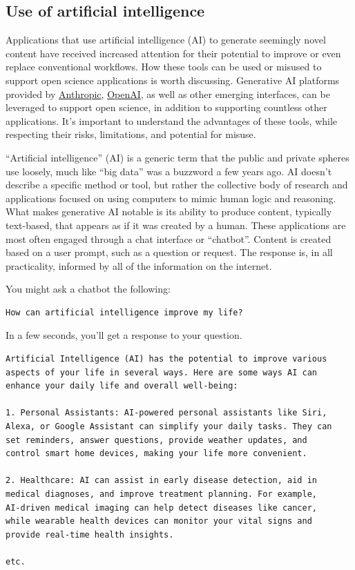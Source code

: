 \documentclass[
]{book}
\begin{document}
\subsection{Use of artificial intelligence}\label{aiuse}

Applications that use artificial intelligence (AI) to generate seemingly novel content have received increased attention for their potential to improve or even replace conventional workflows. How these tools can be used or misused to support open science applications is worth discussing. Generative AI platforms provided by \href{https://www.anthropic.com/}{Anthropic}, \href{https://openai.com/}{OpenAI}, as well as other emerging interfaces, can be leveraged to support open science, in addition to supporting countless other applications. It's important to understand the advantages of these tools, while respecting their risks, limitations, and potential for misuse.

``Artificial intelligence'' (AI) is a generic term that the public and private spheres use loosely, much like ``big data'' was a buzzword a few years ago. AI doesn't describe a specific method or tool, but rather the collective body of research and applications focused on using computers to mimic human logic and reasoning. What makes generative AI notable is its ability to produce content, typically text-based, that appears as if it was created by a human. These applications are most often engaged through a chat interface or ``chatbot''. Content is created based on a user prompt, such as a question or request. The response is, in all practicality, informed by all of the information on the internet.

You might ask a chatbot the following:

\begin{verbatim}
How can artificial intelligence improve my life? 
\end{verbatim}

In a few seconds, you'll get a response to your question.

\begin{verbatim}
Artificial Intelligence (AI) has the potential to improve various
aspects of your life in several ways. Here are some ways AI can 
enhance your daily life and overall well-being:

1. Personal Assistants: AI-powered personal assistants like Siri, 
Alexa, or Google Assistant can simplify your daily tasks. They can 
set reminders, answer questions, provide weather updates, and 
control smart home devices, making your life more convenient.

2. Healthcare: AI can assist in early disease detection, aid in 
medical diagnoses, and improve treatment planning. For example, 
AI-driven medical imaging can help detect diseases like cancer, 
while wearable health devices can monitor your vital signs and 
provide real-time health insights.

etc.
\end{verbatim}
\end{document}
